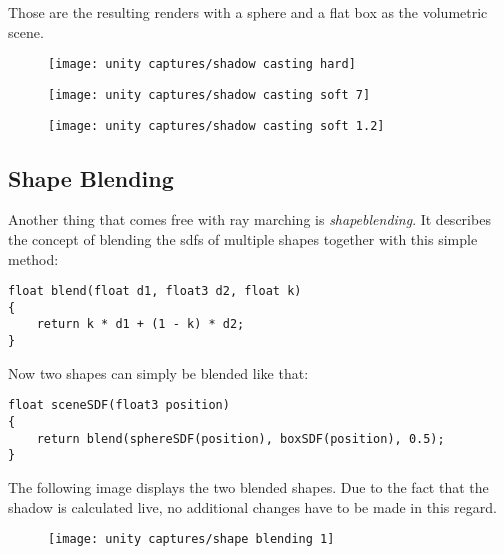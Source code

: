 \noindent
Those are the resulting renders with a sphere and a flat box as the volumetric scene.
\begin{figure}[H]
    \centering
        \begin{minipage}{0.3\linewidth}
            \texttt{[image: unity captures/shadow casting hard]}
            \label{img:captures:shadows:hard}
        \end{minipage}
        \hfill
        \begin{minipage}{0.3\linewidth}
            \texttt{[image: unity captures/shadow casting soft 7]}
            \label{img:captures:shadows:soft2}
        \end{minipage}
        \hfill
        \begin{minipage}{0.3\linewidth}
            \texttt{[image: unity captures/shadow casting soft 1.2]}
            \label{img:captures:shadows:soft1}
        \end{minipage}
\end{figure}

\clearpage
\subsection{Shape Blending}
Another thing that comes free with ray marching is \textit{\gls{shapeblending}}. It describes the concept of blending the \gls{sdf}s of multiple shapes together with this simple method:
\begin{lstlisting}[language=HLSL]
float blend(float d1, float3 d2, float k)
{
    return k * d1 + (1 - k) * d2;
}
\end{lstlisting}

\noindent
Now two shapes can simply be blended like that:
\begin{lstlisting}[language=HLSL]
float sceneSDF(float3 position)
{
    return blend(sphereSDF(position), boxSDF(position), 0.5);
}
\end{lstlisting}

\noindent
The following image displays the two blended shapes. Due to the fact that the shadow is calculated live, no additional changes have to be made in this regard.
\begin{figure}[H]
    \texttt{[image: unity captures/shape blending 1]}
    \label{img:captures:shapeblending1}
\end{figure}

